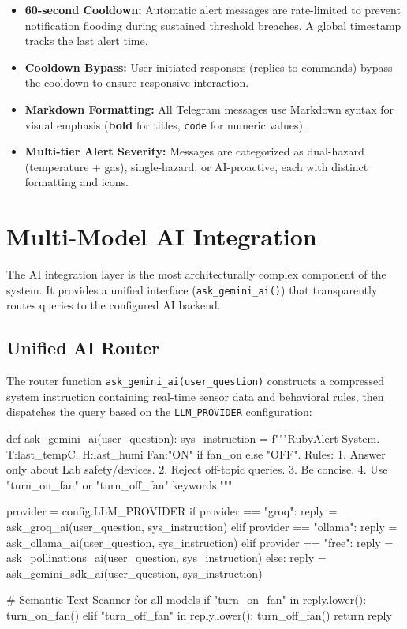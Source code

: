 \documentclass[12pt,a4paper]{report}
\begin{document}
\begin{itemize}
    \item \textbf{60-second Cooldown:} Automatic alert messages are rate-limited to prevent notification flooding during sustained threshold breaches. A global timestamp tracks the last alert time.
    \item \textbf{Cooldown Bypass:} User-initiated responses (replies to commands) bypass the cooldown to ensure responsive interaction.
    \item \textbf{Markdown Formatting:} All Telegram messages use Markdown syntax for visual emphasis (\textbf{bold} for titles, \texttt{code} for numeric values).
    \item \textbf{Multi-tier Alert Severity:} Messages are categorized as dual-hazard (temperature + gas), single-hazard, or AI-proactive, each with distinct formatting and icons.
\end{itemize}

\section{Multi-Model AI Integration}
\label{sec:ai_integration}

The AI integration layer is the most architecturally complex component of the system. It provides a unified interface (\texttt{ask\_gemini\_ai()}) that transparently routes queries to the configured AI backend.

\subsection{Unified AI Router}
The router function \texttt{ask\_gemini\_ai(user\_question)} constructs a compressed system instruction containing real-time sensor data and behavioral rules, then dispatches the query based on the \texttt{LLM\_PROVIDER} configuration:

\begin{codebox}[Python]
def ask_gemini_ai(user_question):
    sys_instruction = f"""RubyAlert System. 
    T:{last_temp}C, H:{last_humi}%
    Fan:{"ON" if fan_on else "OFF"}.
    Rules: 1. Answer only about Lab safety/devices.
    2. Reject off-topic queries. 3. Be concise.
    4. Use "turn_on_fan" or "turn_off_fan" keywords."""
    
    provider = config.LLM_PROVIDER
    if provider == "groq":
        reply = ask_groq_ai(user_question, sys_instruction)
    elif provider == "ollama":
        reply = ask_ollama_ai(user_question, sys_instruction)
    elif provider == "free":
        reply = ask_pollinations_ai(user_question, sys_instruction)
    else:
        reply = ask_gemini_sdk_ai(user_question, sys_instruction)
    
    # Semantic Text Scanner for all models
    if "turn_on_fan" in reply.lower():
        turn_on_fan()
    elif "turn_off_fan" in reply.lower():
        turn_off_fan()
    return reply
\end{codebox}
\end{document}
